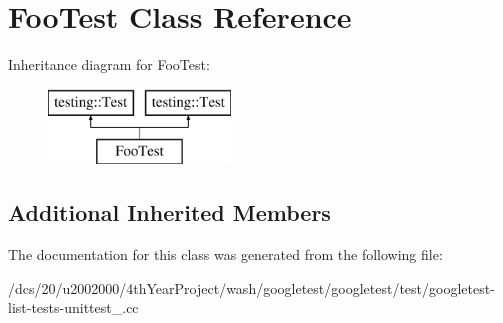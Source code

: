 \hypertarget{classFooTest}{}\section{Foo\+Test Class Reference}
\label{classFooTest}
Inheritance diagram for Foo\+Test\+:\begin{figure}[H]
\begin{center}
\leavevmode
\includegraphics[height=2.000000cm]{classFooTest}
\end{center}
\end{figure}
\subsection*{Additional Inherited Members}


The documentation for this class was generated from the following file\+:\begin{DoxyCompactItemize}
\item 
/dcs/20/u2002000/4th\+Year\+Project/wash/googletest/googletest/test/googletest-\/list-\/tests-\/unittest\+\_\+.\+cc\end{DoxyCompactItemize}
